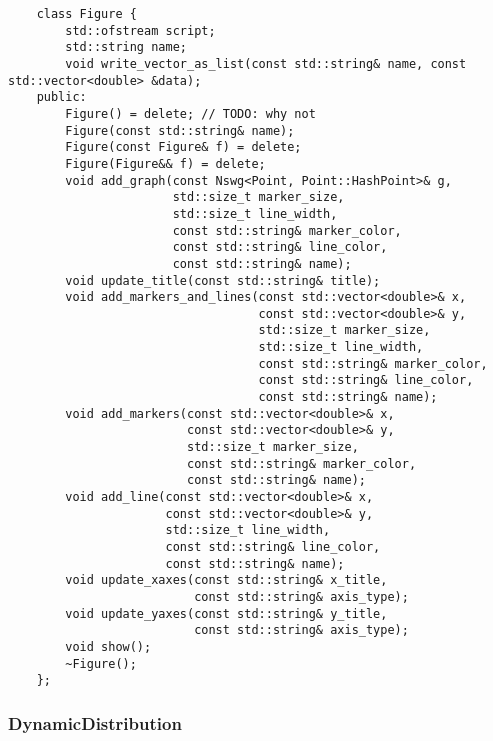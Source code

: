 \begin{verbatim}
    class Figure {
        std::ofstream script;
        std::string name;
        void write_vector_as_list(const std::string& name, const std::vector<double> &data);
    public:
        Figure() = delete; // TODO: why not
        Figure(const std::string& name);
        Figure(const Figure& f) = delete;
        Figure(Figure&& f) = delete;
        void add_graph(const Nswg<Point, Point::HashPoint>& g,
                       std::size_t marker_size,
                       std::size_t line_width,
                       const std::string& marker_color,
                       const std::string& line_color,
                       const std::string& name);
        void update_title(const std::string& title);
        void add_markers_and_lines(const std::vector<double>& x,
                                   const std::vector<double>& y,
                                   std::size_t marker_size,
                                   std::size_t line_width,
                                   const std::string& marker_color,
                                   const std::string& line_color,
                                   const std::string& name);
        void add_markers(const std::vector<double>& x,
                         const std::vector<double>& y,
                         std::size_t marker_size,
                         const std::string& marker_color,
                         const std::string& name);
        void add_line(const std::vector<double>& x,
                      const std::vector<double>& y,
                      std::size_t line_width,
                      const std::string& line_color,
                      const std::string& name);
        void update_xaxes(const std::string& x_title, 
                          const std::string& axis_type);
        void update_yaxes(const std::string& y_title, 
                          const std::string& axis_type);
        void show();
        ~Figure();
    };
\end{verbatim}

\subsubsection{DynamicDistribution}



